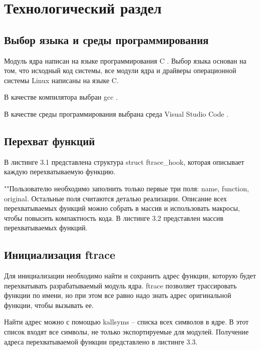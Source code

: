 \chapter{Технологический раздел}

\section{Выбор языка и среды программирования}

Модуль ядра написан на языке программирования C \cite{c-language}. Выбор языка основан на том, что исходный код системы, все модули ядра и драйверы операционной системы Linux написаны на языке C. 

В качестве компилятора выбран gcc \cite{gcc}.

В качестве среды программирования выбрана среда Visual Studio Code \cite{vscode}. 

\section{Перехват функций}

В листинге 3.1 представлена структура struct ftrace\_hook, которая описывает каждую перехватываемую функцию.\newline


""\newline\indent Пользователю необходимо заполнить только первые три поля: name, function, original. Остальные поля считаются деталью реализации. Описание всех перехватываемых функций можно собрать в массив и использовать макросы, чтобы повысить компактность кода. В листинге 3.2 представлен массив перехватываемых функций.\newline

\newpage


\section{Инициализация ftrace}

Для инициализации необходимо найти и сохранить адрес функции, которую будет перехватывать разрабатываемый модуль ядра. ftrace позволяет трассировать функции по имени, но при этом все равно надо знать адрес оригинальной функции, чтобы вызывать ее.

Найти адрес можно с помощью kallsyms -- списка всех символов в ядре. В этот список входят все символы, не только экспортируемые для модулей. Получение адреса перехватываемой функции представлено в листинге 3.3.\newline

